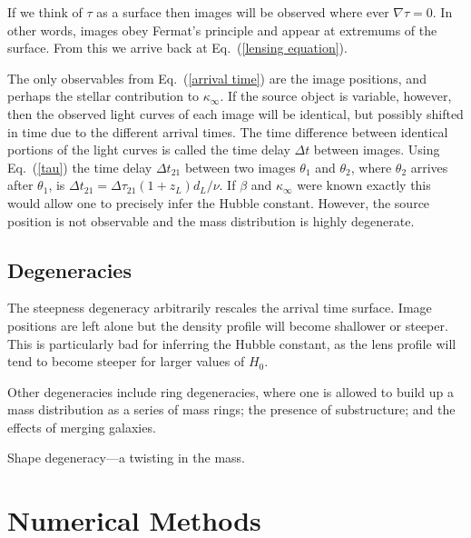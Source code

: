 \documentclass[onecolumn,galley]{mn2e}
\newcommand{\eqnref}[1] {Eq.~(\ref{#1})}
\begin{document}
If we think of $\tau$ as a surface then images will be observed where ever
$\nabla \tau = 0$. In other words, images obey Fermat's principle and appear at
extremums of the surface. From this we arrive back at \eqnref{lensing
equation}.

The only observables from \eqnref{arrival time} are the image positions, and
perhaps the stellar contribution to $\kappa_\infty$.  If the source object is
variable, however, then the observed light curves of each image will be
identical, but possibly shifted in time due to the different arrival times.
The time difference between identical portions of the light curves is called
the time delay $\Delta t$ between images.  Using \eqnref{tau} the time delay
$\Delta t_{21}$ between two images $\theta_1$ and $\theta_2$, where $\theta_2$
arrives after $\theta_1$, is $\Delta t_{21} = \Delta \tau_{21}(1+z_L)d_L /
\nu$. If $\beta$ and $\kappa_\infty$ were known exactly this would allow one
to precisely infer the Hubble constant. However, the source position is not
observable and the mass distribution is highly degenerate.

\subsection{Degeneracies} %

The steepness degeneracy arbitrarily rescales the arrival time surface. Image
positions are left alone but the density profile will become shallower or
steeper. This is particularly bad for inferring the Hubble constant, as the
lens profile will tend to become steeper for larger values of $H_0$.

Other degeneracies include ring degeneracies, where one is allowed to build
up a mass distribution as a series of mass rings; the presence of substructure;
and the effects of merging galaxies. 

Shape degeneracy---a twisting in the mass.

\section{Numerical Methods} 
\end{document}
